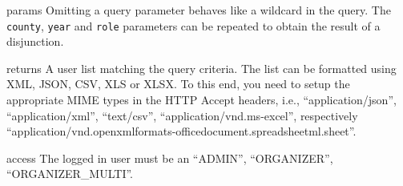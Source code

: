 \begin{apidata}{params}
  Omitting a query parameter behaves like a wildcard in the query. The
  \texttt{county}, \texttt{year} and \texttt{role} parameters can be repeated to
  obtain the result of a disjunction.
\end{apidata}
\begin{apidata}{returns}
  A user list matching the query criteria. The list can be formatted using XML,
  JSON, CSV, XLS or XLSX. To this end, you need to setup the appropriate MIME
  types in the HTTP Accept headers, i.e., ``application/json'',
  ``application/xml'', ``text/csv'', ``application/vnd.ms-excel'', respectively
  ``application/vnd.openxmlformats-officedocument.spreadsheetml.sheet''.
\end{apidata}
\begin{apidata}{access}
The logged in user must be an ``ADMIN'', ``ORGANIZER'', ``ORGANIZER\_MULTI''. 
\end{apidata}


